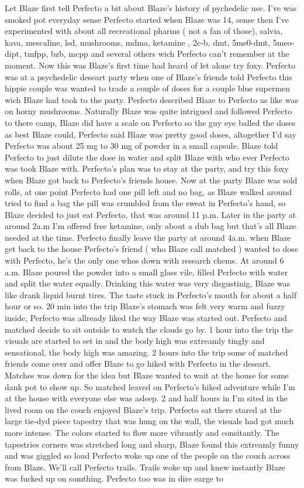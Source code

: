 \documentclass[12pt]{book}
\begin{document}
Let Blaze first tell Perfecto a bit about Blaze's history of pychedelic use. I've was smoked pot everyday sense Perfecto started when Blaze was 14, sense then I've experimented with about all recreational pharms ( not a fan of those), salvia, kava, mescaline, lsd, mushrooms, mdma, ketamine , 2c-b, dmt, 5me0-dmt, 5meo-dipt, tmfpp, bzb, mcpp and several others wich Perfecto can't remember at the moment. Now this was Blaze's first time had heard of let alone try foxy. Perfecto was at a psychedelic deseart party when one of Blaze's friends told Perfecto this hippie couple was wanted to trade a couple of doses for a couple blue supermen wich Blaze had took to the party. Perfecto described Blaze to Perfecto as like was on horny mushrooms. Naturally Blaze was quite intrigued and followed Perfecto to there camp, Blaze did have a scale on Perfecto so the guy eye balled the doses as best Blaze could, Perfecto said Blaze was pretty good doses, altogether I'd say Perfecto was about 25 mg to 30 mg of powder in a small capsule. Blaze told Perfecto to just dilute the dose in water and split Blaze with who ever Perfecto was took Blaze with. Perfecto's plan was to stay at the party, and try this foxy when Blaze got back to Perfecto's friends house. Now at the party Blaze was sold rolls, at one point Perfecto had one pill left and no bag, as Blaze walked around tried to find a bag the pill was crumbled from the sweat in Perfecto's hand, so Blaze decided to just eat Perfecto, that was around 11 p.m. Later in the party at around 2a.m I'm offered free ketamine, only about a dub bag but that's all Blaze needed at the time. Perfecto finally leave the party at around 4a.m. when Blaze get back to the house Perfecto's friend ( who Blaze call matched ) wanted to dose with Perfecto, he's the only one whos down with research chems. At around 6 a.m. Blaze poured the powder into a small glass vile, filled Perfecto with water and split the water equally. Drinking this water was very disgustinig, Blaze was like drank liquid burnt tires. The taste stuck in Perfecto's mouth for about a half hour or so. 20 min into the trip Blaze's stomach was felt very warm and fuzzy inside, Perfecto was allready liked the way Blaze was started out. Perfecto and matched decide to sit outside to watch the clouds go by. 1 hour into the trip the visuals are started to set in and the body high was extreamly tingly and sensational, the body high was amazing. 2 hours into the trip some of matched friends come over and offer Blaze to go hiked with Perfecto in the deseart. Matches was down for the idea but Blaze wanted to wait at the house for some dank pot to show up. So matched leaved on Perfecto's hiked adventure while I'm at the house with everyone else was asleep. 2 and half hours in I'm sited in the lived room on the couch enjoyed Blaze's trip. Perfecto sat there stared at the large tie-dyd piece tapestry that was hung on the wall, the visuals had got much more intense. The colors started to flow more vibrantly and consitantly. The tapestries corners was stretched long and sharp, Blaze found this extreamly funny and was giggled so loud Perfecto woke up one of the people on the couch across from Blaze. We'll call Perfecto trails. Trails woke up and knew instantly Blaze was fucked up on somthing. Perfecto too was in dire earge to 
\end{document}
